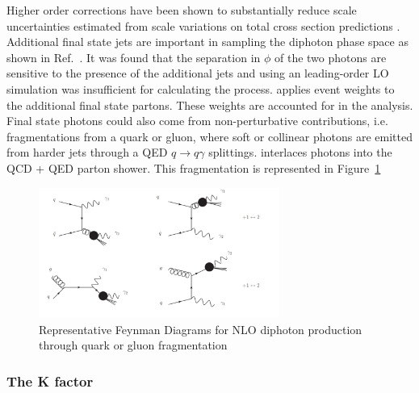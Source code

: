 Higher order corrections have been shown to substantially reduce scale uncertainties estimated from scale variations on total cross section predictions \cite{Badger:2013ava}. Additional final state jets are important in sampling the diphoton phase space as shown in Ref.~\cite{CMS-PAS-EXO-12-045}. It was found that the separation in $\phi$ of the two photons are sensitive to the presence of the additional jets and using an leading-order LO simulation was insufficient for calculating the process. \SHERPA applies event weights to the additional final state partons. These weights are accounted for in the analysis. Final state photons could also come from non-perturbative contributions, i.e. fragmentations from a quark or gluon, where soft or collinear photons are emitted from harder jets through a QED $q\longrightarrow q\gamma$ splittings. \SHERPA interlaces photons into the QCD + QED parton shower. This fragmentation is represented in Figure~\ref{fig:NLOSMBackgroundFragmentation}


\begin{figure}[tbp!]
\begin{center}
\includegraphics[angle=0,width=0.7\textwidth]{fig/GluonOrQuarkFragmentation.png}
\end{center}
\caption{Representative Feynman Diagrams for NLO diphoton production through quark or gluon fragmentation \cite{DErrico:2011cgc}}
\label{fig:NLOSMBackgroundFragmentation}
\end{figure}

\subsubsection{The K factor}

